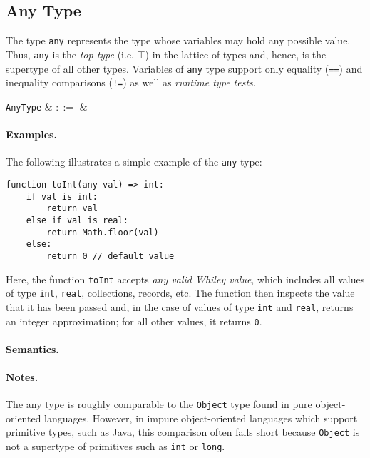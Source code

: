 
\subsection{Any Type}

The type \lstinline{any} represents the type whose variables may hold any possible value.  Thus, \lstinline{any} is the {\em top type} (i.e. $\top$) in the lattice of types and, hence, is the supertype of all other types.  Variables of \lstinline{any} type support only equality (\lstinline{==}) and inequality comparisons (\lstinline{!=}) as well as {\em runtime type tests}.

\begin{syntax}
  \verb+AnyType+ & $::=$ &  \\
\end{syntax}

\paragraph{Examples.}  The following illustrates a simple example of
the \lstinline{any} type:

\begin{lstlisting}
function toInt(any val) => int:
    if val is int:
        return val
    else if val is real:
        return Math.floor(val)
    else:
        return 0 // default value        
\end{lstlisting}

Here, the function \lstinline{toInt} accepts {\em any valid Whiley value}, which includes all values of type \lstinline{int}, \lstinline{real}, collections, records, etc.  The function then inspects the value that it has been passed and, in the case of values of type \lstinline{int} and \lstinline{real}, returns an integer approximation; for all other values, it returns \lstinline{0}.

\paragraph{Semantics.}

\paragraph{Notes.}  The any type is roughly comparable to the \lstinline{Object} type found in pure object-oriented languages.  However, in impure object-oriented languages which support primitive types, such as Java, this comparison often falls short because \lstinline{Object} is not a supertype of primitives such as \lstinline{int} or \lstinline{long}.

